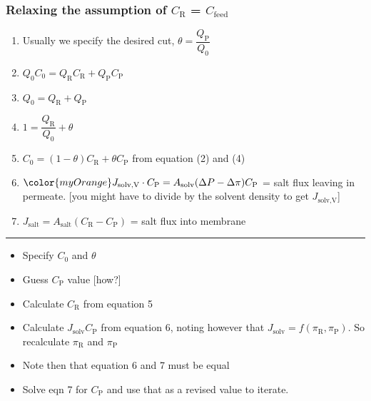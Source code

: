 \begin{frame}\frametitle{Relaxing the assumption of $C_\text{R}$ = $C_\text{feed}$}
	\begin{enumerate}
		\item	Usually we specify the desired cut, $\theta = \dfrac{Q_\text{P}}{Q_\text{0}}$
		\item	$Q_\text{0} C_\text{0} = Q_\text{R} C_\text{R} + Q_\text{P} C_\text{P}$
		\item	$Q_\text{0} = Q_\text{R} + Q_\text{P}$
		\item	$1 = \dfrac{Q_\text{R}}{Q_\text{0}} + \theta$
		\item	$C_\text{0} = (1 - \theta)C_\text{R} + \theta C_\text{P}$ from equation (2) and (4)
		\item	${\color{myOrange}J_\text{solv,V}} \cdot C_\text{P} = A_\text{solv}(\Delta P - \Delta \pi)C_\text{P}$ = salt flux leaving in permeate. \hfill {\color{myOrange}\scriptsize [you might have to divide by the solvent density to get $J_\text{solv,V}$]}
		\item	$J_\text{salt} = A_\text{salt}(C_\text{R} - C_\text{P})$ = salt flux into membrane
	\end{enumerate}
	\hrule
	\begin{itemize}
		\item	Specify $C_\text{0}$ and $\theta$
		\item	Guess $C_\text{P}$ value [how?]
		\item	Calculate $C_\text{R}$ from equation 5
		\item	Calculate $J_\text{solv} C_\text{P}$ from equation 6, noting however that $J_\text{solv} = f(\pi_\text{R}, \pi_\text{P})$. So recalculate $\pi_\text{R}$ and $\pi_\text{P}$
		\item	Note then that equation 6 and 7 must be equal
		\item	Solve eqn 7 for $C_\text{P}$ and use that as a revised value to iterate.
	\end{itemize}
\end{frame}

